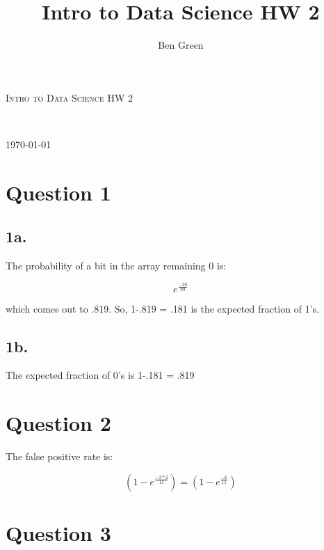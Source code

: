 \documentclass{article}
\author{Ben Green}
\title{Intro to Data Science HW 2}
\begin{document}
\begin{titlepage}
	\begin{center}
	\textsc{\LARGE Intro to Data Science HW 2}\\
	\vspace{3mm}
	
	{\large \theauthor}\\
	
	\tableofcontents
	\setcounter{secnumdepth}{0}
	\vfill
	
	{\large \today}
	\end{center}

\end{titlepage}

\section{Question 1}

\subsection{1a.}

The probability of a bit in the array remaining 0 is:

\begin{equation}
e^\frac{-20}{99}
\end{equation}

\noindent which comes out to .819. So, 1-.819 = .181 is the expected fraction of 1's.

\subsection{1b.}

The expected fraction of 0's is 1-.181 = .819

\section{Question 2}

The false positive rate is:

\begin{equation}
(1-e^{\frac{-3*2}{11}}) = (1-e^\frac{-6}{11})
\end{equation}

\section{Question 3}
\end{document}
